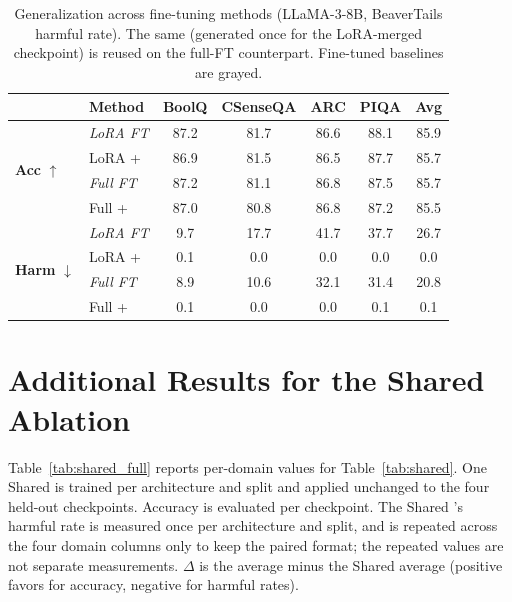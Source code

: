 \begin{table}[htbp]
\caption{Generalization across fine-tuning methods (LLaMA-3-8B, BeaverTails harmful rate). The same \ssn{} (generated once for the LoRA-merged checkpoint) is reused on the full-FT counterpart. Fine-tuned baselines are grayed.}
\label{tab:full_ft}
\centering
\small
\setlength{\tabcolsep}{4pt}
\begin{tabular}{@{}l l ccccc@{}}
\toprule
& \textbf{Method} & \textbf{BoolQ} & \textbf{CSenseQA} & \textbf{ARC} & \textbf{PIQA} & \textbf{Avg} \\
\midrule
\multirow{4}{*}{\textbf{Acc} \(\uparrow\)}
 & \cellcolor{mutegray}\textit{LoRA FT} & \cellcolor{mutegray}87.2 & \cellcolor{mutegray}81.7 & \cellcolor{mutegray}86.6 & \cellcolor{mutegray}88.1 & \cellcolor{mutegray}85.9 \\
 & LoRA + \method{}                     & 86.9 & 81.5 & 86.5 & 87.7 & 85.7 \\
 & \cellcolor{mutegray}\textit{Full FT} & \cellcolor{mutegray}87.2 & \cellcolor{mutegray}81.1 & \cellcolor{mutegray}86.8 & \cellcolor{mutegray}87.5 & \cellcolor{mutegray}85.7 \\
 & Full + \method{}                     & 87.0 & 80.8 & 86.8 & 87.2 & 85.5 \\
\midrule
\multirow{4}{*}{\textbf{Harm} \(\downarrow\)}
 & \cellcolor{mutegray}\textit{LoRA FT} & \cellcolor{mutegray}9.7 & \cellcolor{mutegray}17.7 & \cellcolor{mutegray}41.7 & \cellcolor{mutegray}37.7 & \cellcolor{mutegray}26.7 \\
 & LoRA + \method{}                     & 0.1 & 0.0 & 0.0 & 0.0 & 0.0 \\
 & \cellcolor{mutegray}\textit{Full FT} & \cellcolor{mutegray}8.9 & \cellcolor{mutegray}10.6 & \cellcolor{mutegray}32.1 & \cellcolor{mutegray}31.4 & \cellcolor{mutegray}20.8 \\
 & Full + \method{}                     & 0.1 & 0.0 & 0.0 & 0.1 & 0.1 \\
\bottomrule
\end{tabular}
\end{table}

\section{Additional Results for the Shared \ssn{} Ablation}
\label{app:shared}
Table~\ref{tab:shared_full} reports per-domain values for Table~\ref{tab:shared}. One Shared \ssn{} is trained per architecture and split and applied unchanged to the four held-out checkpoints. Accuracy is evaluated per checkpoint. The Shared \ssn{}'s harmful rate is measured once per architecture and split, and is repeated across the four domain columns only to keep the paired format; the repeated values are not separate measurements. $\Delta$ is the \method{} average minus the Shared \ssn{} average (positive favors \method{} for accuracy, negative for harmful rates).

